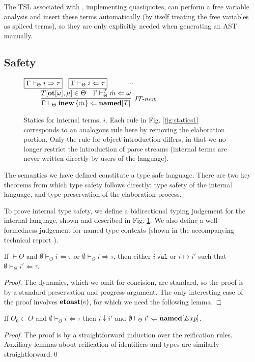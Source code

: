 The TSL associated with , implementing quasiquotes, can perform a free variable analysis and insert these terms automatically (by itself treating the free variables as spliced terms), so they are only explicitly needed when generating an AST manually.

\subsection{Safety}
\begin{figure}[t]
$\fbox{$\Gamma \vdash_\Theta i \Rightarrow \tau$}$~
$\fbox{$\Gamma \vdash_\Theta i \Leftarrow \tau$}$~~~~~~$\cdots$
$
\begin{array}{c}
~~~~~~\infer[\textit{IT-new}]
	{\Gamma \vdash_\Theta \keyw{inew}\,\{\dot{m}\} \Leftarrow \keyw{named}[T]}
	{T[\keyw{ot}[\omega],\mu] \in \Theta & 
	\Gamma \vdash_\Theta^T \dot{m} \Leftarrow \omega}
\end{array}
$\\[1ex]
\caption{Statics for internal terms, $i$. Each rule in Fig. \ref{fig:statics1} corresponds to an analogous rule here by removing the elaboration portion. Only the rule for object introduction differs, in that we no longer restrict the introduction of parse streams (internal terms are never written directly by users of the language). }
\label{it-statics}
\vspace{-5px}
\end{figure}


The semantics we have defined constitute a type safe language. There are two key theorems from which type safety follows directly: type safety of the internal language, and type preservation of the elaboration process. 

To prove internal type safety, we define a bidirectional typing judgement for the internal language, shown and described in Fig. \ref{it-statics}. We also define a well-formedness judgement for named type contexts (shown in the accompanying technical report \cite{TR}). 

\begin{theorem}
If $\vdash \Theta$ and $\emptyset \vdash_\Theta i \Leftarrow \tau$ or $\emptyset \vdash_\Theta i \Rightarrow \tau$, then either $i~\mathtt{val}$ or $i \mapsto i'$ such that $\emptyset \vdash_\Theta i' \Leftarrow \tau$.
\end{theorem}
\begin{proof}
The dynamics, which we omit for concision, are standard, so the proof is by a standard preservation and progress argument. The only interesting case of the proof involves $\textbf{etoast}(e)$, for which we need the following lemma.
\end{proof}
\begin{lemma}[Reification]
If $\Theta_0 \subset \Theta$ and $\emptyset \vdash_{\Theta} i \Leftarrow \tau$ then $i \downarrow i'$ and $\emptyset \vdash_{\Theta} i' \Leftarrow \textbf{named}[Exp]$.
\end{lemma}
\begin{proof}
The proof is by a straightforward induction over the reification rules. Auxiliary lemmas about reification of identifiers and types are similarly straightforward.\qed
\end{proof}


